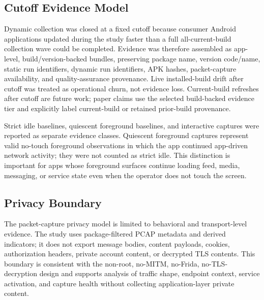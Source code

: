 \subsection{Cutoff Evidence Model}

Dynamic collection was closed at a fixed cutoff because consumer Android applications updated during the study faster than a full all-current-build collection wave could be completed. Evidence was therefore assembled as app-level, build/version-backed bundles, preserving package name, version code/name, static run identifiers, dynamic run identifiers, APK hashes, packet-capture availability, and quality-assurance provenance. Live installed-build drift after cutoff was treated as operational churn, not evidence loss. Current-build refreshes after cutoff are future work; paper claims use the selected build-backed evidence tier and explicitly label current-build or retained prior-build provenance.

Strict idle baselines, quiescent foreground baselines, and interactive captures were reported as separate evidence classes. Quiescent foreground captures represent valid no-touch foreground observations in which the app continued app-driven network activity; they were not counted as strict idle. This distinction is important for apps whose foreground surfaces continue loading feed, media, messaging, or service state even when the operator does not touch the screen.

\subsection{Privacy Boundary}

The packet-capture privacy model is limited to behavioral and transport-level evidence. The study uses package-filtered PCAP metadata and derived indicators; it does not export message bodies, content payloads, cookies, authorization headers, private account content, or decrypted TLS contents. This boundary is consistent with the non-root, no-MITM, no-Frida, no-TLS-decryption design and supports analysis of traffic shape, endpoint context, service activation, and capture health without collecting application-layer private content.

